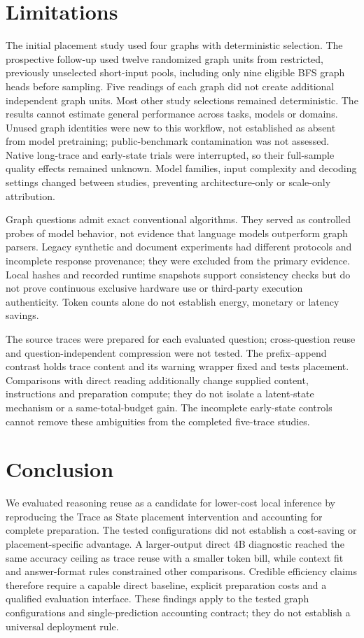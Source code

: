\section{Limitations}
The initial placement study used four graphs with deterministic selection. The prospective follow-up used twelve randomized graph units from restricted, previously unselected short-input pools, including only nine eligible BFS graph heads before sampling. Five readings of each graph did not create additional independent graph units. Most other study selections remained deterministic. The results cannot estimate general performance across tasks, models or domains. Unused graph identities were new to this workflow, not established as absent from model pretraining; public-benchmark contamination was not assessed. Native long-trace and early-state trials were interrupted, so their full-sample quality effects remained unknown. Model families, input complexity and decoding settings changed between studies, preventing architecture-only or scale-only attribution.

Graph questions admit exact conventional algorithms. They served as controlled probes of model behavior, not evidence that language models outperform graph parsers. Legacy synthetic and document experiments had different protocols and incomplete response provenance; they were excluded from the primary evidence. Local hashes and recorded runtime snapshots support consistency checks but do not prove continuous exclusive hardware use or third-party execution authenticity. Token counts alone do not establish energy, monetary or latency savings.

The source traces were prepared for each evaluated question; cross-question reuse and question-independent compression were not tested. The prefix--append contrast holds trace content and its warning wrapper fixed and tests placement. Comparisons with direct reading additionally change supplied content, instructions and preparation compute; they do not isolate a latent-state mechanism or a same-total-budget gain. The incomplete early-state controls cannot remove these ambiguities from the completed five-trace studies.

\section{Conclusion}
We evaluated reasoning reuse as a candidate for lower-cost local inference by reproducing the Trace as State placement intervention and accounting for complete preparation. The tested configurations did not establish a cost-saving or placement-specific advantage. A larger-output direct 4B diagnostic reached the same accuracy ceiling as trace reuse with a smaller token bill, while context fit and answer-format rules constrained other comparisons. Credible efficiency claims therefore require a capable direct baseline, explicit preparation costs and a qualified evaluation interface. These findings apply to the tested graph configurations and single-prediction accounting contract; they do not establish a universal deployment rule.
